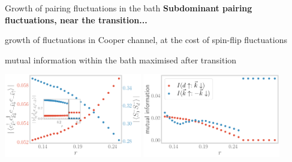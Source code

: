 \documentclass[9pt,aspectratio=169]{beamer}
\begin{document}
\begin{frame}{Growth of pairing fluctuations in the bath}
\centering
\textbf{\alert{Subdominant pairing fluctuations}, near the transition...}

\vspace*{\fill}

\begin{minipage}{0.42\textwidth}
\begin{itemize}
	\nitem growth of fluctuations in Cooper channel, at the cost of spin-flip fluctuations
\end{itemize}
\end{minipage}
\hspace*{\fill}
\begin{minipage}{0.4\textwidth}
\begin{itemize}
	\nitem mutual information within the bath maximised after transition
\end{itemize}
\end{minipage}

\vspace*{\fill}

\includegraphics[width=0.45\textwidth]{spinflip-pairing.pdf}
\hspace*{\fill}
\includegraphics[width=0.45\textwidth]{I_k.pdf}
\end{frame}
\end{document}
